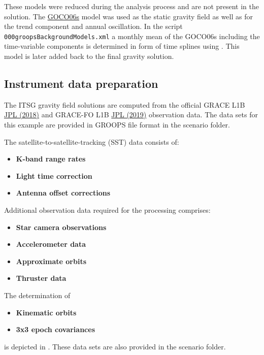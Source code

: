 These models were reduced during the analysis process and are not present in the solution.
The \href{https://doi.org/10.5194/essd-13-99-2021}{GOCO06s}
model was used as the static gravity field as well as for the trend component and annual oscillation.
In the script \verb|000groopsBackgroundModels.xml| a monthly mean of the GOCO06s including the time-variable components is determined
in form of time splines using . This model is later added back to the final gravity solution.

\subsection{Instrument data preparation}\label{cookbook.gravityFieldGrace:metadata}
The ITSG gravity field solutions are computed from the official GRACE L1B \href{https://doi.org/10.5067/GRJPL-L1B03}{JPL (2018)}
and GRACE-FO L1B \href{https://doi.org/10.5067/GFL1B-ASJ04}{JPL (2019)} observation data. The data sets for this example are provided
in GROOPS file format in the scenario folder.

The satellite-to-satellite-tracking (SST) data consists of:
\begin{itemize}
  \item \textbf{K-band range rates}
  \item \textbf{Light time correction}
  \item \textbf{Antenna offset corrections}
\end{itemize}

Additional observation data required for the processing comprises:
\begin{itemize}
  \item \textbf{Star camera observations}
  \item \textbf{Accelerometer data}
  \item \textbf{Approximate orbits} %
  \item \textbf{Thruster data}
\end{itemize}

The determination of
\begin{itemize}
  \item \textbf{Kinematic orbits}
  \item \textbf{3x3 epoch covariances}
\end{itemize}
is depicted in .
These data sets are also provided in the scenario folder.

